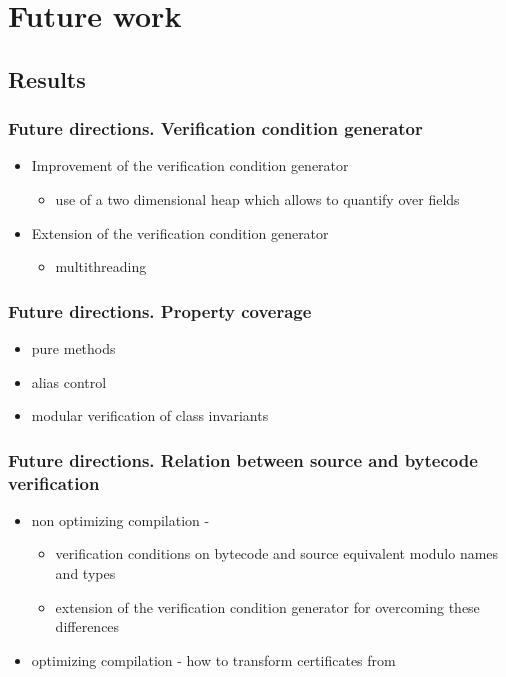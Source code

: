 \documentclass{beamer}
\begin{document}
 \section{Future work}
     \subsection{Results}
\begin{frame}\frametitle{Future directions. Verification condition generator}
         \begin{itemize}
	   \item Improvement of the verification condition generator 
              \begin{itemize}
	           \item use of a two dimensional heap which allows to quantify over fields 
               \end{itemize}
	    \item Extension of the verification condition generator 
                 \begin{itemize}
	             \item   multithreading
		  \end{itemize}
          \end{itemize}
\end{frame}

\begin{frame}\frametitle{Future directions. Property coverage  }
	   
                  \begin{itemize}
	                \item pure methods 
			  \item alias control
			  \item modular verification of class invariants
			    
		   \end{itemize}  

\end{frame}

\begin{frame}\frametitle{Future directions. Relation between source and bytecode verification}
		
		     \begin{itemize}
	                 \item non optimizing compilation - 
                           \begin{itemize}
	                      \item verification conditions on bytecode and source equivalent modulo names and types
                               \item extension of the verification condition generator 
			       for overcoming these differences
			    \end{itemize}
			   
			  \item optimizing compilation - how to transform certificates from 
                    \end{itemize}
           

\end{frame}
\end{document}
